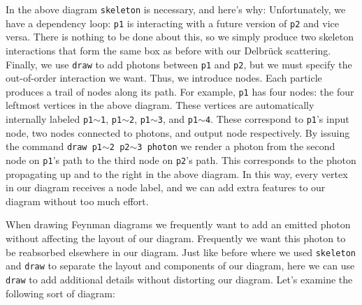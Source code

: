 \documentclass[12pt]{article}
\begin{document}
In the above diagram \texttt{skeleton} is necessary, and here's why:
Unfortunately, we have a dependency loop: \texttt{p1} is interacting with a future version of \texttt{p2} and vice versa.
There is nothing to be done about this, so we simply produce two skeleton interactions that form the same box as before with our Delbr\"uck scattering.
Finally, we use \texttt{draw} to add photons between \texttt{p1} and \texttt{p2}, but we must specify the out-of-order interaction we want.
Thus, we introduce nodes.
Each particle produces a trail of nodes along its path.
For example, \texttt{p1} has four nodes: the four leftmost vertices in the above diagram.
These vertices are automatically internally labeled \texttt{p1$\sim$1}, \texttt{p1$\sim$2}, \texttt{p1$\sim$3}, and \texttt{p1$\sim$4}.
These correspond to \texttt{p1}'s input node, two nodes connected to photons, and output node respectively.
By issuing the command \texttt{draw p1$\sim$2 p2$\sim$3 photon} we render a photon from the second node on \texttt{p1}'s path to the third node on \texttt{p2}'s path.
This corresponds to the photon propagating up and to the right in the above diagram.
In this way, every vertex in our diagram receives a node label, and we can add extra features to our diagram without too much effort.

\newpage
When drawing Feynman diagrams we frequently want to add an emitted photon without affecting the layout of our diagram.
Frequently we want this photon to be reabsorbed elsewhere in our diagram.
Just like before where we used \texttt{skeleton} and \texttt{draw} to separate the layout and components of our diagram, here we can use \texttt{draw} to add additional details without distorting our diagram.
Let's examine the following sort of diagram:
\end{document}
